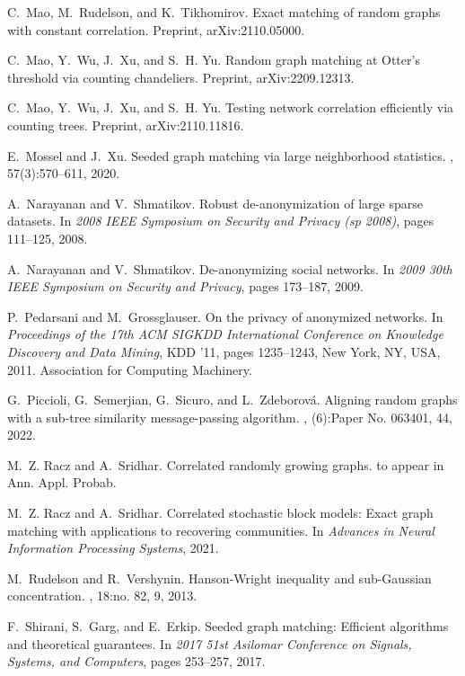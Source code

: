 \documentclass[11pt]{article}
\numberwithin{equation}{section}
\begin{document}
\begin{thebibliography}{10}
C.~Mao, M.~Rudelson, and K.~Tikhomirov.
\newblock Exact matching of random graphs with constant correlation.
\newblock Preprint, arXiv:2110.05000.

C.~Mao, Y.~Wu, J.~Xu, and S.~H. Yu.
\newblock Random graph matching at {O}tter's threshold via counting
  chandeliers.
\newblock Preprint, arXiv:2209.12313.

C.~Mao, Y.~Wu, J.~Xu, and S.~H. Yu.
\newblock Testing network correlation efficiently via counting trees.
\newblock Preprint, arXiv:2110.11816.

E.~Mossel and J.~Xu.
\newblock Seeded graph matching via large neighborhood statistics.
, 57(3):570--611, 2020.

A.~Narayanan and V.~Shmatikov.
\newblock Robust de-anonymization of large sparse datasets.
\newblock In {\em 2008 IEEE Symposium on Security and Privacy (sp 2008)}, pages 111--125, 2008.

A.~Narayanan and V.~Shmatikov.
\newblock De-anonymizing social networks.
\newblock In {\em 2009 30th IEEE Symposium on Security and Privacy}, pages 173--187, 2009.

P.~Pedarsani and M.~Grossglauser.
\newblock On the privacy of anonymized networks.
\newblock In {\em Proceedings of the 17th ACM SIGKDD International Conference on Knowledge Discovery and Data Mining}, KDD '11, pages 1235--1243, New York, NY, USA, 2011. Association for Computing Machinery.

G.~Piccioli, G.~Semerjian, G.~Sicuro, and L.~Zdeborov\'{a}.
\newblock Aligning random graphs with a sub-tree similarity message-passing algorithm.
, (6):Paper No. 063401, 44, 2022.

M.~Z. Racz and A.~Sridhar.
\newblock Correlated randomly growing graphs.
\newblock to appear in Ann. Appl. Probab.

M.~Z. Racz and A.~Sridhar.
\newblock Correlated stochastic block models: Exact graph matching with applications to recovering communities.
\newblock In {\em Advances in Neural Information Processing Systems}, 2021.

M.~Rudelson and R.~Vershynin.
\newblock Hanson-{W}right inequality and sub-Gaussian concentration.
, 18:no. 82, 9, 2013.

F.~Shirani, S.~Garg, and E.~Erkip.
\newblock Seeded graph matching: Efficient algorithms and theoretical
  guarantees.
\newblock In {\em 2017 51st Asilomar Conference on Signals, Systems, and Computers}, pages 253--257, 2017.


\end{thebibliography}
\end{document}
